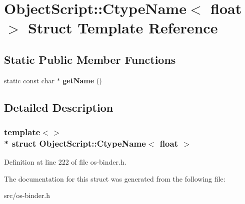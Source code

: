 \hypertarget{struct_object_script_1_1_ctype_name_3_01float_01_4}{}\section{Object\+Script\+:\+:Ctype\+Name$<$ float $>$ Struct Template Reference}
\label{struct_object_script_1_1_ctype_name_3_01float_01_4}
\subsection*{Static Public Member Functions}
\begin{DoxyCompactItemize}
\item 
static const char $\ast$ {\bfseries get\+Name} ()\hypertarget{struct_object_script_1_1_ctype_name_3_01float_01_4_a07e0be9f000078cce63fb96e18d22e68}{}\label{struct_object_script_1_1_ctype_name_3_01float_01_4_a07e0be9f000078cce63fb96e18d22e68}

\end{DoxyCompactItemize}


\subsection{Detailed Description}
\subsubsection*{template$<$$>$\\*
struct Object\+Script\+::\+Ctype\+Name$<$ float $>$}



Definition at line 222 of file os-\/binder.\+h.



The documentation for this struct was generated from the following file\+:\begin{DoxyCompactItemize}
\item 
src/os-\/binder.\+h\end{DoxyCompactItemize}
